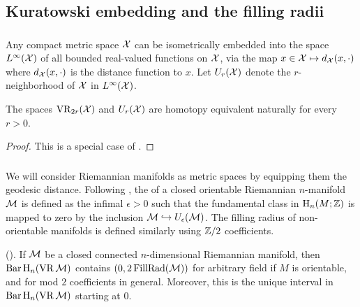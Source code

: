

\subsection{Kuratowski embedding and the filling radii}\label{sub:general_barcodes}

\subsubsection{}\label{ss:kuratowski}

Any compact metric space $\mathcal{X}$ can be isometrically embedded into the space $L^\infty(\mathcal{X})$ of all bounded real-valued functions on $\mathcal{X}$, via the map $x \in \mathcal{X} \mapsto d_{\mathcal{X}}(x,\cdot)$ where $d_{\mathcal{X}}(x,\cdot)$ is the distance function to $x$.
Let $U_r(\mathcal{X})$ denote the $r$-neighborhood of $\mathcal{X}$ in $L^\infty(\mathcal{X})$.

\medskip\lemma The spaces $\operatorname{VR}_{2r}(\mathcal{X})$ and $U_r(\mathcal{X})$ are homotopy equivalent naturally for every \(r > 0\).

\begin{proof}
	This is a special case of \cite[Theorem.4.1]{lim2020vietoris}.
\end{proof}

\subsubsection{}\label{ss:filling_radius}

We will consider Riemannian manifolds as metric spaces by equipping them the geodesic distance.
Following \cite{gromov1983filling}, the  of a closed orientable Riemannian $n$-manifold $\mathcal{M}$ is defined as the infimal $\epsilon > 0$ such that the fundamental class in $\mathrm{H}_n(M; \mathbb{Z})$ is mapped to zero by the inclusion $\mathcal{M} \hookrightarrow U_\epsilon(\mathcal{M})$.
The filling radius of non-orientable manifolds is defined similarly using \(\mathbb{Z}/2\) coefficients.

\medskip\lemma(\cite[Prop.9.28]{lim2020vietoris}). If $\mathcal{M}$ be a closed connected $n$-dimensional Riemannian manifold, then \(\operatorname{Bar} \operatorname{H}_{n}(\operatorname{VR} \mathcal{M})\) contains \((0,2\operatorname{FillRad}(\mathcal{M}))\) for arbitrary field if $M$ is orientable, and for mod $2$ coefficients in general.
Moreover, this is the unique interval in \(\operatorname{Bar} \operatorname{H}_{n}(\operatorname{VR} \mathcal{M})\) starting at $0$.

